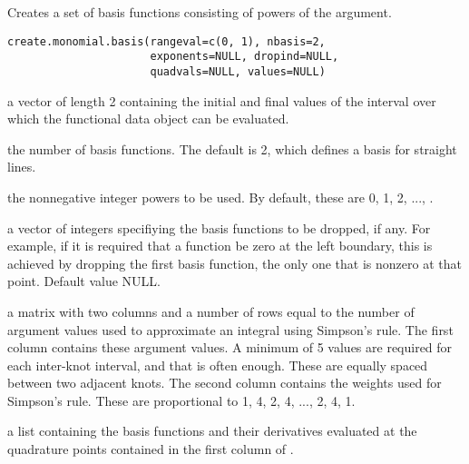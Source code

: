\documentclass{article}
\begin{document}
\begin{Description}\relax
Creates a set of basis functions consisting of powers
of the argument.
\end{Description}
\begin{Usage}
\begin{verbatim}
create.monomial.basis(rangeval=c(0, 1), nbasis=2,
                      exponents=NULL, dropind=NULL,
                      quadvals=NULL, values=NULL)
\end{verbatim}
\end{Usage}
\begin{Arguments}
\begin{ldescription}
\item[\code{rangeval}] a vector of length 2 containing the initial and final
values of the interval over which the functional
data object can be evaluated.

\item[\code{nbasis}] the number of basis functions. The default is 2,
which defines a basis for straight lines.

\item[\code{exponents}] the nonnegative integer powers to be used.  By default,
these are 0, 1, 2, ..., .

\item[\code{dropind}] a vector of integers specifiying the basis functions to
be dropped, if any.  For example, if it is required that
a function be zero at the left boundary, this is achieved
by dropping the first basis function, the only one that
is nonzero at that point. Default value NULL.

\item[\code{quadvals}] a matrix with two columns and a number of rows equal to the number of
argument values used to approximate an integral using Simpson's rule.
The first column contains these argument values.
A minimum of 5 values are required for
each inter-knot interval, and that is often enough. These
are equally spaced between two adjacent knots.
The second column contains the weights used for Simpson's
rule.  These are proportional to 1, 4, 2, 4, ..., 2, 4, 1.

\item[\code{values}] a list containing the basis functions and their derivatives
evaluated at the quadrature points contained in the first
column of .

\end{ldescription}
\end{Arguments}
\end{document}

